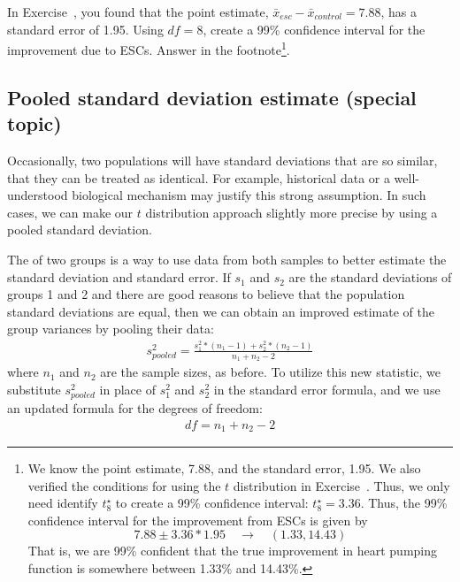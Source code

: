 \begin{exercise}
In Exercise~, you found that the point estimate, $\bar{x}_{esc} - \bar{x}_{control} = 7.88$, has a standard error of 1.95. Using $df=8$, create a 99\% confidence interval for the improvement due to ESCs. Answer in the footnote\footnote{We know the point estimate, 7.88, and the standard error, 1.95. We also verified the conditions for using the $t$ distribution in Exercise~. Thus, we only need identify $t^{\star}_8$ to create a 99\% confidence interval: $t^{\star}_{8} = 3.36$. Thus, the 99\% confidence interval for the improvement from ESCs is given by $$7.88 \pm 3.36*1.95 \quad\to\quad (1.33, 14.43)$$ That is, we are 99\% confident that the true improvement in heart pumping function is somewhere between 1.33\% and 14.43\%.}.
\end{exercise}

\subsection{Pooled standard deviation estimate (special topic)}
\label{pooledStandardDeviations}

Occasionally, two populations will have standard deviations that are so similar, that they can be treated as identical. For example, historical data or a well-understood biological mechanism may justify this strong assumption. In such cases, we can make our $t$ distribution approach slightly more precise by using a pooled standard deviation.

The  of two groups is a way to use data from both samples to better estimate the standard deviation and standard error. If $s_1^{}$ and $s_2^{}$ are the standard deviations of groups 1 and 2 and there are good reasons to believe that the population standard deviations are equal, then we can obtain an improved estimate of the group variances by pooling their data:
\begin{align*}
s_{pooled}^2 = \frac{s_1^2*(n_1-1) + s_2^2*(n_2-1)}{n_1 + n_2 - 2}
\end{align*}
where $n_1$ and $n_2$ are the sample sizes, as before. To utilize this new statistic, we substitute $s_{pooled}^2$ in place of $s_1^2$ and $s_2^2$ in the standard error formula, and we use an updated formula for the degrees of freedom:
\begin{align*}
df = n_1 + n_2 - 2
\end{align*}

